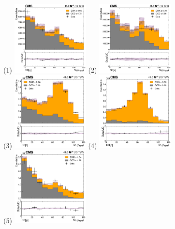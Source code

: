 \begin{figure}
  \centering
  \subfigure(1) \includegraphics[width=0.35\textwidth]{template_fit/2017/mt_low_Electron_15.0.png} \hfill
  \subfigure(2) \includegraphics[width=0.35\textwidth]{template_fit/2017/mt_low_Electron_20.0.png} \\
  \subfigure(3) \includegraphics[width=0.35\textwidth]{template_fit/2017/mt_high_Electron_25.0.png} \hfill
  \subfigure(4) \includegraphics[width=0.35\textwidth]{template_fit/2017/mt_high_Electron_45.0.png} \\
  \subfigure(5) \includegraphics[width=0.35\textwidth]{template_fit/2017/mt_low_Muon_15.0.png} \hfill

\end{figure}
